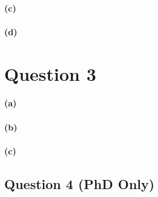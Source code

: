 \documentclass{scrartcl}
\begin{document}
\paragraph*{(c)}



\paragraph*{(d)}

\section*{Question 3}

\paragraph*{(a)}

\paragraph*{(b)}

\paragraph*{(c)}

\subsection*{Question 4 (PhD Only)}
\end{document}
